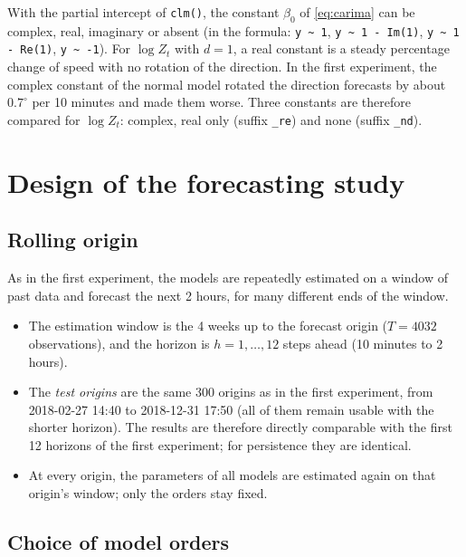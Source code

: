 \documentclass[11pt,a4paper]{article}
\newcommand{\code}[1]{\texttt{#1}}
\newcommand{\1}{\mathbf{1}}
\begin{document}
With the partial intercept of \code{clm()}, the constant $\beta_0$ of \eqref{eq:carima} can be
complex, real, imaginary or absent (in the formula: \code{y \textasciitilde{} 1},
\code{y \textasciitilde{} 1 - Im(1)}, \code{y \textasciitilde{} 1 - Re(1)},
\code{y \textasciitilde{} -1}). For $\log Z_t$ with $d = 1$, a real constant is a steady
percentage change of speed with no rotation of the direction. In the first experiment, the
complex constant of the normal model rotated the direction forecasts by about $0.7^\circ$ per 10
minutes and made them worse. Three constants are therefore compared for $\log Z_t$: complex, real
only (suffix \code{\_re}) and none (suffix \code{\_nd}).

\section{Design of the forecasting study}\label{sec:design}

\subsection{Rolling origin}

As in the first experiment, the models are repeatedly estimated on a window of past data and
forecast the next 2 hours, for many different ends of the window.
\begin{itemize}
  \item The estimation window is the 4 weeks up to the forecast origin ($T = 4032$
    observations), and the horizon is $h = 1, \dots, 12$ steps ahead (10 minutes to 2 hours).
  \item The \emph{test origins} are the same 300 origins as in the first experiment, from
    2018-02-27 14:40 to 2018-12-31 17:50 (all of them remain usable with the shorter horizon).
    The results are therefore directly comparable with the first 12 horizons of the first
    experiment; for persistence they are identical.
  \item At every origin, the parameters of all models are estimated again on that origin's
    window; only the orders stay fixed.
\end{itemize}

\subsection{Choice of model orders}\label{sec:selection}
\end{document}
